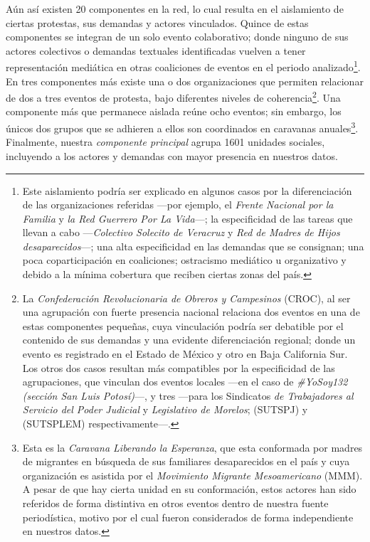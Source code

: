 \documentclass[letterpaper, 11pt]{book}
\theoremstyle{definition}
\theoremstyle{remark}
\begin{document}
Aún así existen 20 componentes en la red, lo cual resulta en el aislamiento de ciertas protestas, sus demandas y actores vinculados. 
Quince de estas componentes se integran de un solo evento colaborativo; donde ninguno de sus actores colectivos o demandas textuales identificadas vuelven a tener representación mediática en otras coaliciones de eventos en el periodo analizado\footnote{
    Este aislamiento podría ser explicado en algunos casos por la diferenciación de las organizaciones referidas ---por ejemplo, el \emph{Frente Nacional por la Familia} y \emph{la Red Guerrero Por La Vida}---; la especificidad de las tareas que llevan a cabo ---\emph{Colectivo Solecito de Veracruz} y \emph{Red de Madres de Hijos desaparecidos}---; una alta especificidad en las demandas que se consignan; una poca coparticipación en coaliciones; ostracismo mediático u organizativo y debido a la mínima cobertura que reciben ciertas zonas del país. 
}. 
En tres componentes más existe una o dos organizaciones que permiten relacionar de dos a tres eventos de protesta, bajo diferentes niveles de coherencia\footnote{
    La \emph{Confederación Revolucionaria de Obreros y Campesinos} (CROC), al ser una agrupación con fuerte presencia nacional relaciona dos eventos en una de estas componentes pequeñas, cuya vinculación podría ser debatible por el contenido de sus demandas y una evidente diferenciación regional; donde un evento es registrado en el Estado de México y otro en Baja California Sur. 
    Los otros dos casos resultan más compatibles por la especificidad de las agrupaciones, que vinculan dos eventos locales ---en el caso de \emph{\#YoSoy132 (sección San Luis Potosí)}---, y tres ---para los Sindicatos \emph{de Trabajadores al Servicio del Poder Judicial} y \emph{Legislativo de Morelos}; (SUTSPJ) y (SUTSPLEM) respectivamente---. 
}. 
Una componente más que permanece aislada reúne ocho eventos; sin embargo, los únicos dos grupos que se adhieren a ellos son coordinados en caravanas anuales\footnote{
    Esta es la \emph{Caravana Liberando la Esperanza}, que esta conformada por madres de migrantes en búsqueda de sus familiares desaparecidos en el país y cuya organización es asistida por el \emph{Movimiento Migrante Mesoamericano} (MMM). 
    A pesar de que hay cierta unidad en su conformación, estos actores han sido referidos de forma distintiva en otros eventos dentro de nuestra fuente periodística, motivo por el cual fueron considerados de forma independiente en nuestros datos. 
}. 
Finalmente, nuestra \emph{componente principal} agrupa 1601 unidades sociales, incluyendo a los actores y demandas con mayor presencia en nuestros datos. 
\end{document}
